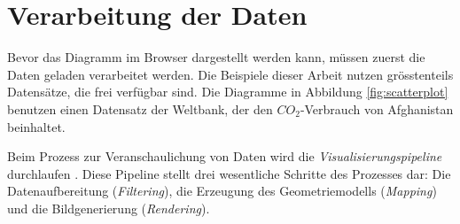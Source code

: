 \section{Verarbeitung der Daten}

Bevor das Diagramm im Browser dargestellt werden kann, müssen zuerst die Daten geladen verarbeitet werden. Die Beispiele dieser Arbeit nutzen grösstenteils Datensätze, die frei verfügbar sind. Die Diagramme in Abbildung \ref{fig:scatterplot} benutzen einen Datensatz der Weltbank, der den $CO_2$-Verbrauch von Afghanistan beinhaltet.

Beim Prozess zur Veranschaulichung von Daten wird die \textit{Visualisierungspipeline} durchlaufen \cite{pipeline}. Diese Pipeline stellt drei wesentliche Schritte des Prozesses dar: Die Datenaufbereitung (\textit{Filtering}), die Erzeugung des Geometriemodells (\textit{Mapping}) und die Bildgenerierung (\textit{Rendering}).

